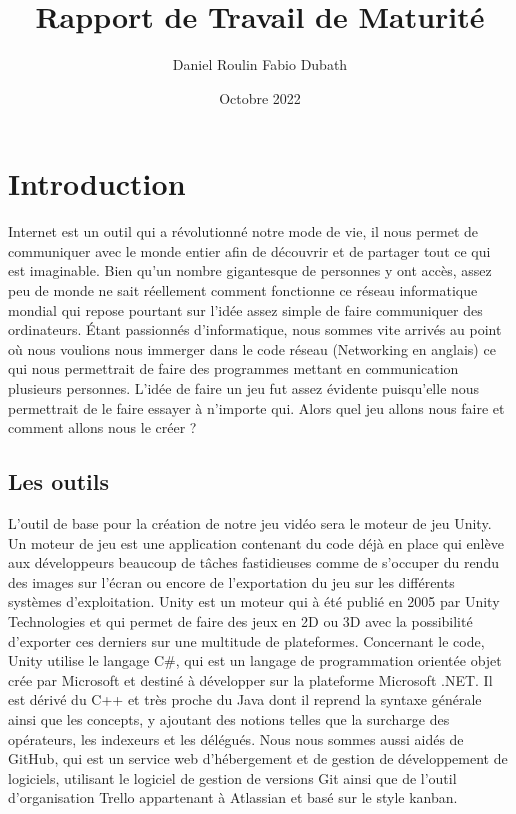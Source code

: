 \documentclass[a4paper]{article}
\title{Rapport de Travail de Maturité}
\author{Daniel Roulin \cr Fabio Dubath}
\date{Octobre 2022}
\begin{document}
\maketitle

\newpage

\tableofcontents

\newpage

\section{Introduction}
Internet est un outil qui a révolutionné notre mode de vie, il nous permet de communiquer avec le monde entier afin de découvrir et de partager tout ce qui est imaginable. Bien qu’un nombre gigantesque de personnes y ont accès, assez peu de monde ne sait réellement comment fonctionne ce réseau informatique mondial qui repose pourtant sur l’idée assez simple de faire communiquer des ordinateurs. Étant passionnés d'informatique, nous sommes vite arrivés au point où nous voulions nous immerger dans le code réseau (Networking en anglais) ce qui nous permettrait de faire des programmes mettant en communication plusieurs personnes. L’idée de faire un jeu fut assez évidente puisqu'elle nous permettrait de le faire essayer à n'importe qui. Alors quel jeu allons nous faire et comment allons nous le créer ?

\subsection{Les outils}
L’outil de base pour la création de notre jeu vidéo sera le moteur de jeu Unity. Un moteur de jeu est une application contenant du code déjà en place qui enlève aux développeurs beaucoup de tâches fastidieuses comme de s’occuper du rendu des images sur l’écran ou encore de l’exportation du jeu sur les différents systèmes d’exploitation. Unity est un moteur qui à été publié en 2005 par Unity Technologies et qui permet de faire des jeux en 2D ou 3D avec la possibilité d’exporter ces derniers sur une multitude de plateformes. Concernant le code, Unity utilise le langage C\#, qui est un langage de programmation orientée objet crée par Microsoft et destiné à développer sur la plateforme Microsoft .NET. Il est dérivé du C++ et très proche du Java dont il reprend la syntaxe générale ainsi que les concepts, y ajoutant des notions telles que la surcharge des opérateurs, les indexeurs et les délégués. Nous nous sommes aussi aidés de GitHub, qui est un service web d'hébergement et de gestion de développement de logiciels, utilisant le logiciel de gestion de versions Git ainsi que de l'outil d'organisation Trello\cite{trello} appartenant à Atlassian et basé sur le style kanban.
\end{document}

